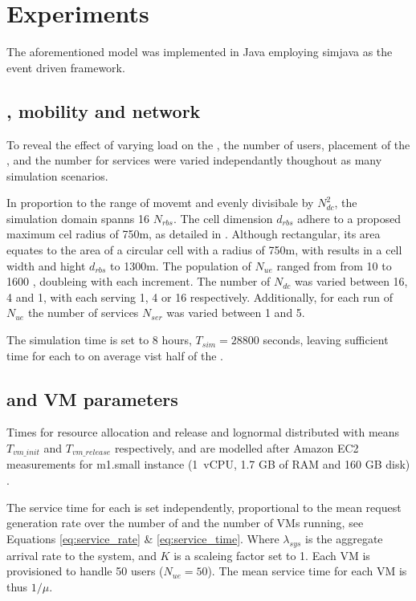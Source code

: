 \section{Experiments}
\label{sec:experiments}

The aforementioned model was implemented in Java employing simjava \cite{SimJava} as the event driven framework.

\subsection{\Ue, mobility and network}
To reveal the effect of varying load on the \dcs, the number of users, placement of the \dcs{}, and the number for services were varied independantly thoughout as many simulation scenarios. 



In proportion to the range of movemt and evenly divisibale by $N_{dc}^2$, the simulation domain spanns 16 \rbss{} $N_{rbs}$. The cell dimension $d_{rbs}$ adhere to a proposed maximum cel radius of 750m, as detailed in \cite{shahab2013framework}. Although rectangular, its area equates to the area of a circular cell with a radius of 750m, with results in a cell width and hight $d_{rbs}$ to 1300m. The population of \ues{} $N_{ue}$ ranged from from 10 to 1600 \ues{}, doubleing with each increment. The number of \dcs{} $N_{dc}$ was varied between 16, 4 and 1, with each \dc{} serving 1, 4 or 16 \rbss{} respectively. Additionally, for each run of $N_{ue}$ the number of services $N_{ser}$ was varied between 1 and 5.

The simulation time is set to 8 hours, $T_{sim}=28800$ seconds, leaving sufficient time for each \ue to on average vist half of the \rbss.

\subsection{\Dc and VM parameters}
Times for resource allocation and release and lognormal distributed with means $T_{vm\_init}$ and $T_{vm\_release}$ respectively, and are modelled after Amazon EC2 measurements for m1.small instance (1~vCPU, 1.7 GB of RAM and 160 GB disk) \cite{5719609}. %

The service time for each \dc{} is set independently, proportional to the mean request generation rate over the number of \rbss{} and the number of VMs running, see Equations \ref{eq:service_rate} \& \ref{eq:service_time}. Where $\lambda_{sys}$ is the aggregate arrival rate to the system, and $K$ is a scaleing factor set to 1. Each VM is provisioned to handle 50 users ($N_{ue} = 50$). The mean service time for each VM is thus $1/\mu$.

